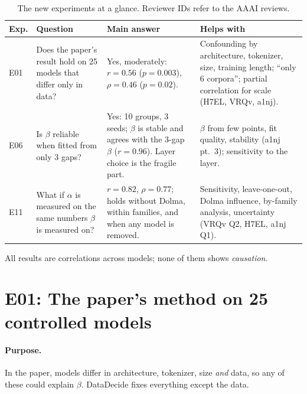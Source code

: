 \documentclass[11pt]{article}
\begin{document}
\begin{table}[h]
\centering\small
\caption{The new experiments at a glance. Reviewer IDs refer to the AAAI reviews.}
\label{tab:overview}
\begin{tabularx}{\textwidth}{@{}l L L L@{}}
\toprule
Exp. & Question & Main answer & Helps with \\
\midrule
E01 & Does the paper's result hold on 25 models that differ only in data? &
  Yes, moderately: $r=0.56$ ($p=0.003$), $\rho=0.46$ ($p=0.02$). &
  Confounding by architecture, tokenizer, size, training length; ``only 6 corpora''; partial
  correlation for scale (H7EL, VRQv, a1nj). \\
E06 & Is $\beta$ reliable when fitted from only 3 gaps? &
  Yes: 10 groups, 3 seeds; $\beta$ is stable and agrees with the 3-gap $\beta$ ($r=0.96$).
  Layer choice is the fragile part. &
  $\beta$ from few points, fit quality, stability (a1nj pt.~3); sensitivity to the layer. \\
E11 & What if $\alpha$ is measured on the same numbers $\beta$ is measured on? &
  $r=0.82$, $\rho=0.77$; holds without Dolma, within families, and when any model is removed. &
  Sensitivity, leave-one-out, Dolma influence, by-family analysis, uncertainty (VRQv Q2, H7EL, a1nj Q1). \\
\bottomrule
\end{tabularx}
\end{table}

\noindent All results are correlations across models; none of them shows \emph{causation}.

\section{E01: The paper's method on 25 controlled models}

\paragraph{Purpose.} In the paper, models differ in architecture, tokenizer, size \emph{and} data, so
any of these could explain $\beta$. DataDecide fixes everything except the data.
\end{document}
